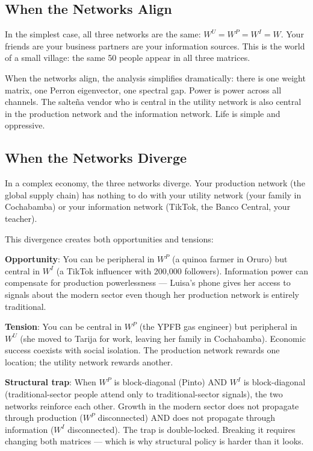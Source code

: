 \documentclass[../structural_economics_book.tex]{subfiles}
\begin{document}
\subsection{When the Networks Align}

In the simplest case, all three networks are the same: $W^U = W^P = W^I = W$. Your friends are your business partners are your information sources. This is the world of a small village: the same 50 people appear in all three matrices.

When the networks align, the analysis simplifies dramatically: there is one weight matrix, one Perron eigenvector, one spectral gap. Power is power across all channels. The salte\~{n}a vendor who is central in the utility network is also central in the production network and the information network. Life is simple and oppressive.

\subsection{When the Networks Diverge}

In a complex economy, the three networks diverge. Your production network (the global supply chain) has nothing to do with your utility network (your family in Cochabamba) or your information network (TikTok, the Banco Central, your teacher).

This divergence creates both opportunities and tensions:

\textbf{Opportunity}: You can be peripheral in $W^P$ (a quinoa farmer in Oruro) but central in $W^I$ (a TikTok influencer with 200,000 followers). Information power can compensate for production powerlessness --- Luisa's phone gives her access to signals about the modern sector even though her production network is entirely traditional.

\textbf{Tension}: You can be central in $W^P$ (the YPFB gas engineer) but peripheral in $W^U$ (she moved to Tarija for work, leaving her family in Cochabamba). Economic success coexists with social isolation. The production network rewards one location; the utility network rewards another.

\textbf{Structural trap}: When $W^P$ is block-diagonal (Pinto) AND $W^I$ is block-diagonal (traditional-sector people attend only to traditional-sector signals), the two networks reinforce each other. Growth in the modern sector does not propagate through production ($W^P$ disconnected) AND does not propagate through information ($W^I$ disconnected). The trap is double-locked. Breaking it requires changing both matrices --- which is why structural policy is harder than it looks.
\end{document}
